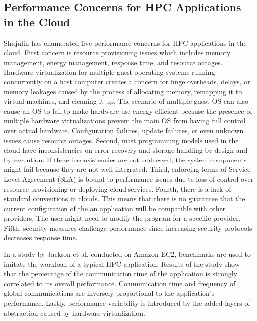     \subsection{Performance Concerns for HPC Applications in the Cloud}
        Shajulin \cite {8521133920130201} has enumerated five performance concerns for HPC applications in the cloud. First concern is resource provisioning issues which includes memory management, \newline \newline energy management, response time, and resource outages.  Hardware virtualization for multiple guest operating systems running concurrently on a host computer creates a concern for huge overheads, delays, or memory leakages caused by the process of allocating memory, remapping it to virtual machines, and cleaning it up. The scenario of multiple guest OS can also cause an OS to fail to make hardware use energy-efficient because the presence of multiple hardware virtualizations prevent the main OS from having full control over actual hardware. Configuration failures, update failures, or even unknown issues cause resource outages. Second, most programming models used in the cloud have inconsistencies on error recovery and storage handling by design and by execution. If these inconsistencies are not addressed, the system components might fail because they are not well-integrated.        
        Third, enforcing terms of Service Level Agreement (SLA) is bound to performance issues due to loss of control over resource provisioning or deploying cloud services. Fourth, there is a lack of standard conventions in clouds. This means that there is no guarantee that the current configuration of the an application will be compatible with other providers. The user might need to modify the program for a specific provider.  
          Fifth, security measures challenge performance since increasing security protocols decreases response time.

         In a study by Jackson et al.\cite{CloudCom2010} conducted on Amazon EC2, benchmarks are used to imitate the workload of a typical HPC application.
         Results of the study show that the percentage of the communication time of the application is strongly correlated to its overall performance. Communication time and frequency of global communications are inversely proportional to the application's performance.
        Lastly, performance variability is introduced by the added layers of abstraction caused by hardware virtualization.
         
